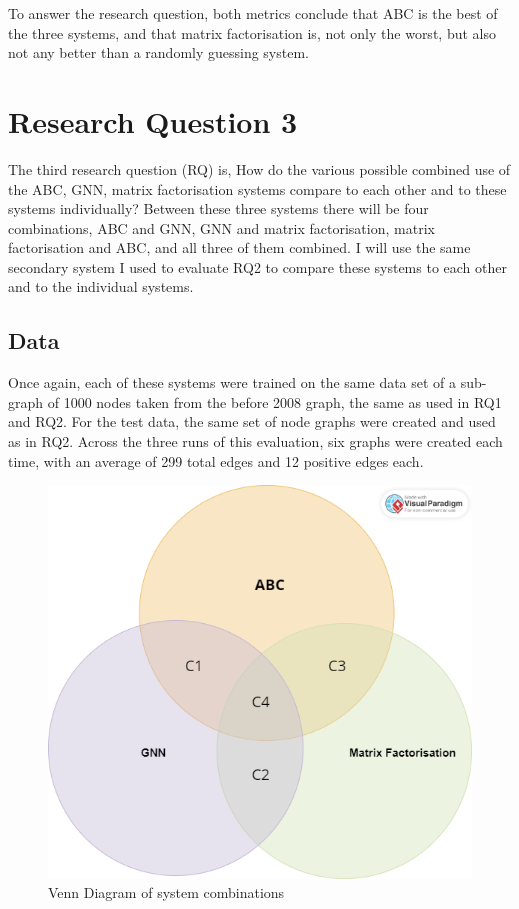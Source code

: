 \documentclass{l4proj}
\begin{document}
To answer the research  question, both metrics conclude that ABC is the best of the three systems, and that matrix factorisation is, not only the worst, but also not any better than a randomly guessing system. \\

\section{Research Question 3}

The third research question (RQ) is, How do the various possible combined use of the ABC, GNN, matrix factorisation systems compare to each other and to these systems individually? Between these three systems there will be four combinations, ABC and GNN, GNN and matrix factorisation, matrix factorisation and ABC, and all three of them combined. I will use the same secondary system I used to evaluate RQ2 to compare these systems to each other and to the individual systems. \\

\subsection{Data}

Once again, each of these systems were trained on the same data set of a sub-graph of 1000 nodes taken from the before 2008 graph, the same as used in RQ1 and RQ2. For the test data, the same set of node graphs were created and used as in RQ2. Across the three runs of this evaluation, six graphs were created each time, with an average of 299 total edges and 12 positive edges each. \\

\begin{figure}[h]
    \centering
    \includegraphics[width=0.6\linewidth]{images/Combination_venn.png}
    \caption{Venn Diagram of system combinations}
    \label{fig:venn}
\end{figure}
\end{document}
